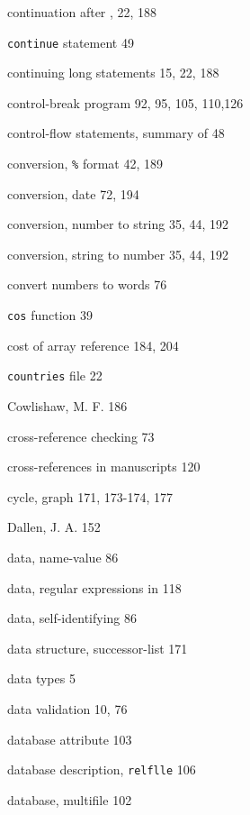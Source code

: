 \begin{multicols}{3}
\hangindent=3pc  continuation after , 22, 188

\hangindent=3pc  \verb'continue' statement 49

\hangindent=3pc  continuing long statements 15, 22, 188

\hangindent=3pc  control-break program 92, 95, 105, 110,126

\hangindent=3pc  control-flow statements, summary of 48

\hangindent=3pc  conversion, \verb'%' format 42, 189

\hangindent=3pc  conversion, date 72, 194

\hangindent=3pc  conversion, number to string 35, 44, 192

\hangindent=3pc  conversion, string to number 35, 44, 192

\hangindent=3pc  convert numbers to words 76

\hangindent=3pc  \verb'cos' function 39

\hangindent=3pc  cost of array reference 184, 204

\hangindent=3pc  \verb'countries' file 22

\hangindent=3pc  Cowlishaw, M. F. 186

\hangindent=3pc  cross-reference checking 73

\hangindent=3pc  cross-references in manuscripts 120

\hangindent=3pc  cycle, graph 171, 173-174, 177

\hangindent=3pc  Dallen, J. A. 152

\hangindent=3pc  data, name-value 86

\hangindent=3pc  data, regular expressions in 118

\hangindent=3pc  data, self-identifying 86

\hangindent=3pc  data structure, successor-list 171

\hangindent=3pc  data types 5

\hangindent=3pc  data validation 10, 76

\hangindent=3pc  database attribute 103

\hangindent=3pc  database description, \verb'relflle' 106

\hangindent=3pc  database, multifile 102


\end{multicols}
